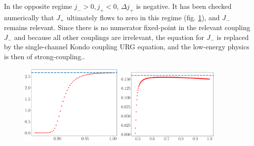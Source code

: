 \documentclass{revtex4-2}
\numberwithin{equation}{section}
\begin{document}
In the opposite regime \(j_- > 0, j_+ < 0\), \(\Delta j_+\) is negative. It has been checked numerically that \(J_+\) ultimately flows to zero in this regime (fig. \ref{irrel_Jplus}), and \(J_-\) remains relevant. Since there is no numerator fixed-point in the relevant coupling \(J_-\) and because all other couplings are irrelevant, the equation for \(J_-\) is replaced by the single-channel Kondo coupling URG equation, and the low-energy physics is then of strong-coupling..
\begin{figure}[htpb]
	\centering
	\includegraphics[width=0.45\textwidth]{../numerics/irr_Jp_K=3.pdf}
	\includegraphics[width=0.45\textwidth]{../numerics/irr_Jp_K=50.pdf}
	\label{irrel_Jplus}
\end{figure}
\end{document}

